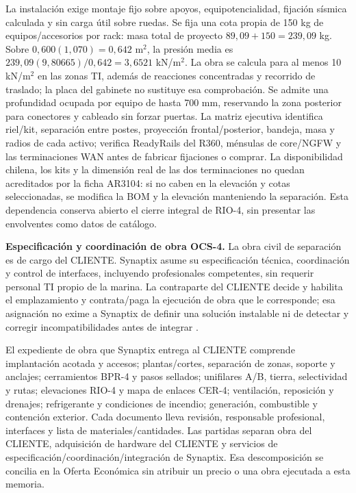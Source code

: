 La instalación exige montaje fijo sobre apoyos, equipotencialidad, fijación sísmica calculada y sin carga útil sobre ruedas. Se fija una cota propia de 150 kg de equipos/accesorios por rack: masa total de proyecto $89,09+150=239,09$ kg. Sobre $0,600(1,070)=0,642$ m$^2$, la presión media es $239,09(9,80665)/0,642=3,6521$ kN/m$^2$. La obra se calcula para al menos 10 kN/m$^2$ en las zonas TI, además de reacciones concentradas y recorrido de traslado; la placa del gabinete no sustituye esa comprobación. Se admite una profundidad ocupada por equipo de hasta 700 mm, reservando la zona posterior para conectores y cableado sin forzar puertas. La matriz ejecutiva identifica riel/kit, separación entre postes, proyección frontal/posterior, bandeja, masa y radios de cada activo; verifica ReadyRails del R360, ménsulas de core/NGFW y las terminaciones WAN antes de fabricar fijaciones o comprar. La disponibilidad chilena, los kits y la dimensión real de las dos terminaciones no quedan acreditados por la ficha AR3104: si no caben en la elevación y cotas seleccionadas, se modifica la BOM y la elevación manteniendo la separación. Esta dependencia conserva abierto el cierre integral de RIO-4, sin presentar las envolventes como datos de catálogo.

\textbf{Especificación y coordinación de obra OCS-4.}\label{sec:sd4-obra-ocs4}
La obra civil de separación es de cargo del CLIENTE. Synaptix asume su especificación técnica, coordinación y control de interfaces, incluyendo profesionales competentes, sin requerir personal TI propio de la marina. La contraparte del CLIENTE decide y habilita el emplazamiento y contrata/paga la ejecución de obra que le corresponde; esa asignación no exime a Synaptix de definir una solución instalable ni de detectar y corregir incompatibilidades antes de integrar \parencites[RT-06.06, p.~15]{pucv-transversal}[cap.~15, RT-06.01]{caso07}.

El expediente de obra que Synaptix entrega al CLIENTE comprende implantación acotada y accesos; plantas/cortes, separación de zonas, soporte y anclajes; cerramientos BPR-4 y pasos sellados; unifilares A/B, tierra, selectividad y rutas; elevaciones RIO-4 y mapa de enlaces CER-4; ventilación, reposición y drenajes; refrigerante y condiciones de incendio; generación, combustible y contención exterior. Cada documento lleva revisión, responsable profesional, interfaces y lista de materiales/cantidades. Las partidas separan obra del CLIENTE, adquisición de hardware del CLIENTE y servicios de especificación/coordinación/integración de Synaptix. Esa descomposición se concilia en la Oferta Económica sin atribuir un precio o una obra ejecutada a esta memoria.

